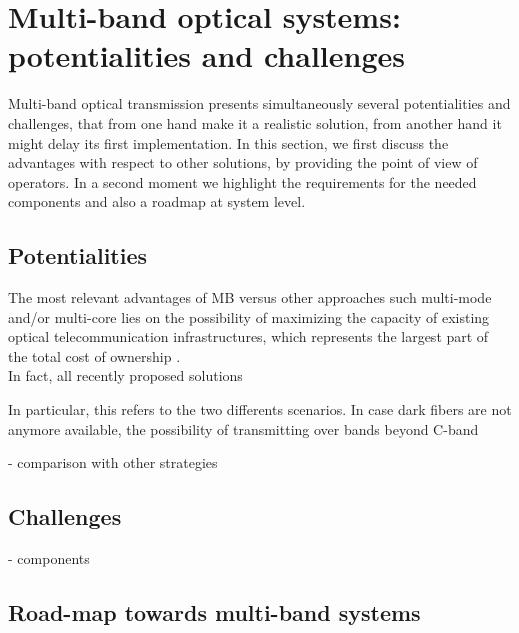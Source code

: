 \documentclass[journal]{IEEEtran}
\begin{document}
\section{Multi-band optical systems: potentialities and challenges}\label{Sec:MB_optical_systems}
Multi-band optical transmission presents simultaneously several potentialities and challenges, that from one hand make it a realistic solution, from another hand it might delay its first implementation. In this section, we first discuss the advantages with respect to other solutions, by providing the point of view of operators. In a second moment we highlight the requirements for the needed components and also a roadmap at system level.

\subsection{Potentialities}
The most relevant advantages of MB versus other approaches such multi-mode and/or multi-core lies on the possibility of maximizing the capacity of existing optical telecommunication infrastructures, which represents the largest part of the total cost of ownership \cite{telefonica}.\\

In fact, all recently proposed solutions

 In particular, this refers to the two differents scenarios.
In case dark fibers are not anymore available, the possibility of transmitting over bands beyond C-band

- comparison with other strategies\\

\subsection{Challenges}
- components\\

\subsection{Road-map towards multi-band systems}
\end{document}
